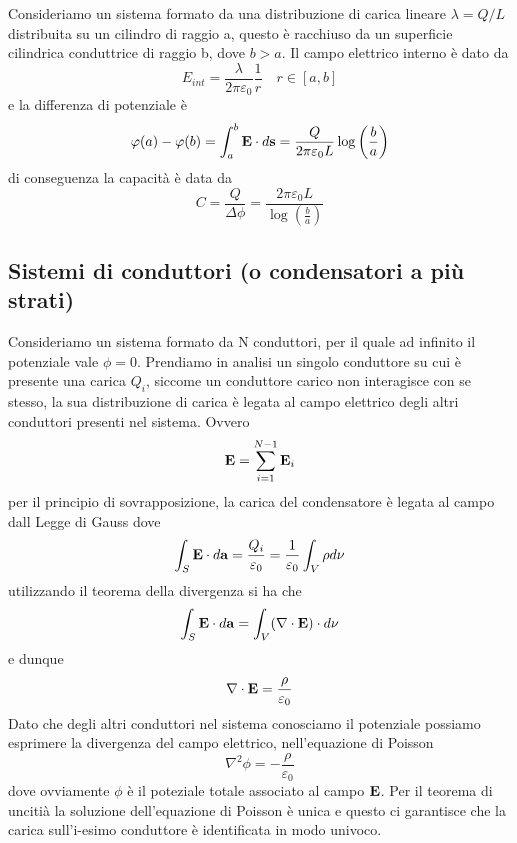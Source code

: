 Consideriamo un sistema formato da una distribuzione di carica lineare $\lambda = Q/L$ distribuita su un cilindro di raggio a, questo \`e racchiuso da un superficie cilindrica conduttrice di raggio b, dove $b>a$. Il campo elettrico interno \`e dato da 
\begin{equation*}
	E_{int} = \frac{\lambda}{2 \pi \varepsilon_0 } \frac{1}{r } \quad r \in [a,b]
\end{equation*}
e la differenza di potenziale \`e 
\begin{equation*}
	\varphi(a) - \varphi(b) = \int_{a}^{b} \bold{E} \cdot d\bold{s} = \frac{Q}{2 \pi \varepsilon_0 L } \log \left(\frac{b}{a}\right )
\end{equation*}
di conseguenza la capacit\`a \`e data da
\begin{equation*}
	C = \frac{Q}{\Delta \phi} = \frac{2 \pi \varepsilon_0 L}{\log \left(\frac{b}{a} \right)}
\end{equation*}

\subsection{Sistemi di conduttori (o condensatori a pi\`u strati)}

Consideriamo un sistema formato da N conduttori, per il quale ad infinito il potenziale vale $\phi = 0$. Prendiamo in analisi un singolo conduttore su cui \`e presente una carica $Q_i$, siccome un conduttore carico non interagisce con se stesso, la sua distribuzione di carica \`e legata al campo elettrico degli altri conduttori presenti nel sistema. Ovvero
\begin{equation*}
	\bold{E} = \sum_{i = 1}^{N-1}\bold{E}_i
\end{equation*} 
per il principio di sovrapposizione, la carica del condensatore \`e legata al campo dall Legge di Gauss dove 
\begin{equation*}
	\int_{S} \bold{E} \cdot d\bold{a} = \frac{Q_i}{\varepsilon_0} = \frac{1}{\varepsilon_0}\int_{V} \rho d\nu
\end{equation*}
utilizzando il teorema della divergenza si ha che 
\begin{equation*}
	\int_{S} \bold{E} \cdot d\bold{a}=\int_{V} (\nabla \cdot \bold{E}) \cdot d\nu
\end{equation*}
e dunque 
\begin{equation*}
	\nabla \cdot \bold{E} = \frac{\rho}{\varepsilon_0}
\end{equation*}
Dato che degli altri conduttori nel sistema conosciamo il potenziale possiamo esprimere la divergenza del campo elettrico, nell'equazione di Poisson 
\begin{equation*}
	\nabla^2\phi = - \frac{\rho}{\varepsilon_0}
\end{equation*}
dove ovviamente $\phi$ \`e il poteziale totale associato al campo $\bold{E}$. Per il teorema di unciti\`a la soluzione dell'equazione di Poisson \`e unica e questo ci garantisce che la carica sull'i-esimo conduttore \`e identificata in modo univoco.